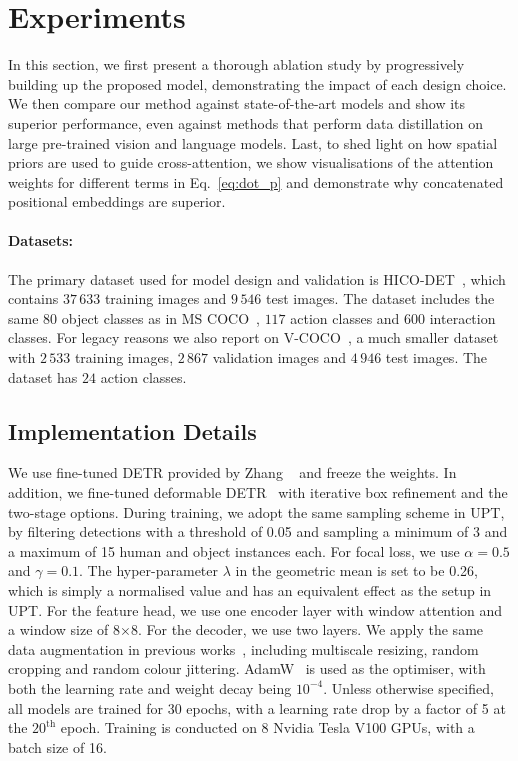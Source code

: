 \documentclass[10pt,twocolumn,letterpaper]{article}
\begin{document}
\section{Experiments}
\label{sec:experiments}

In this section, we first present a thorough ablation study by progressively building up the proposed model, demonstrating the impact of each design choice. We then compare our method against state-of-the-art models and show its superior performance, even against methods that perform data distillation on large pre-trained vision and language models. Last, to shed light on how spatial priors are used to guide cross-attention, we show visualisations of the attention weights for different terms in Eq.~\ref{eq:dot_p} and demonstrate why concatenated positional embeddings are superior.

\paragraph{Datasets:}
The primary dataset used for model design and validation is HICO-DET~\cite{hicodet}, which contains $37\,633$ training images and $9\,546$ test images. The dataset includes the same $80$ object classes as in MS COCO~\cite{coco}, $117$ action classes and $600$ interaction classes. For legacy reasons we also report on V-COCO~\cite{vcoco}, a much smaller dataset with $2\,533$ training images, $2\,867$ validation images and $4\,946$ test images. The dataset has $24$ action classes.

\subsection{Implementation Details}

We use fine-tuned DETR provided by Zhang \etal~\cite{upt} and freeze the weights. In addition, we fine-tuned deformable DETR~\cite{deform-detr} with iterative box refinement and the two-stage options. During training, we adopt the same sampling scheme in UPT, by filtering detections with a threshold of 0.05 and sampling a minimum of 3 and a maximum of 15 human and object instances each. For focal loss, we use $\alpha = 0.5$ and $\gamma=0.1$. The hyper-parameter $\lambda$ in the geometric mean is set to be 0.26, which is simply a normalised value and has an equivalent effect as the setup in UPT. For the feature head, we use one encoder layer with window attention and a window size of 8$\times$8. For the decoder, we use two layers.
We apply the same data augmentation in previous works~\cite{detr, qpic, upt}, including multiscale resizing, random cropping and random colour jittering. AdamW~\cite{adamw} is used as the optimiser, with both the learning rate and weight decay being $10^{-4}$. Unless otherwise specified, all models are trained for 30 epochs, with a learning rate drop by a factor of 5 at the $20^{\text{th}}$ epoch. Training is conducted on 8 Nvidia Tesla V100 GPUs, with a batch size of 16.
\end{document}
